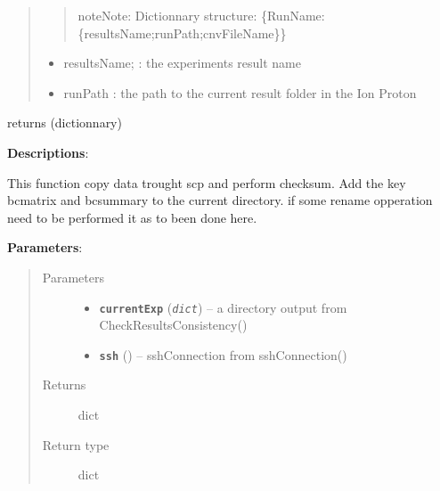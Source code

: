 \documentclass[letterpaper,10pt,english]{sphinxmanual}
\begin{document}
\begin{fulllineitems}
\begin{quote}
\begin{description}
\begin{quote}
\begin{notice}{note}{Note:}
Dictionnary structure: \{RunName: \{resultsName;runPath;cnvFileName\}\}
\end{notice}
\end{quote}
\begin{itemize}
\item {} 
resultsName; : the experiments result name

\item {} 
runPath : the path to the current result folder in the Ion Proton

\end{itemize}


\end{description}\end{quote}

\end{fulllineitems}


\begin{fulllineitems}
\label{datamanagerpkg:datamanagerpkg.ProtonCommunication_data_manager.copyData}
returns (dictionnary)

\textbf{Descriptions}:

This function copy data trought scp and perform checksum. Add the key bcmatrix
and bcsummary to the current directory. if some rename opperation need to be performed
it as to been done here.

\textbf{Parameters}:
\begin{quote}\begin{description}
\item[{Parameters}] \leavevmode\begin{itemize}
\item {} 
\textbf{\texttt{currentExp}} (\emph{\texttt{dict}}) -- a directory output from CheckResultsConsistency()

\item {} 
\textbf{\texttt{ssh}} ({\hyperref[datamanagerpkg:datamanagerpkg.ProtonCommunication_data_manager.sshConnection]{}}) -- sshConnection from sshConnection()

\end{itemize}

\item[{Returns}] \leavevmode
dict

\item[{Return type}] \leavevmode
dict

\end{description}\end{quote}

\end{fulllineitems}
\end{document}
